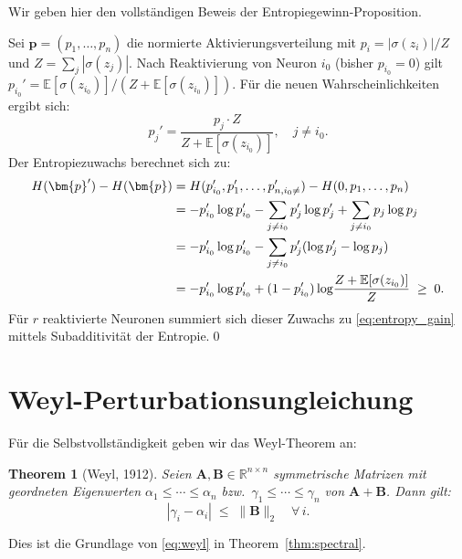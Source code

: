 \documentclass[12pt, a4paper, openany]{report}
\newtheorem{theorem}{Theorem}[chapter]
\newcommand{\R}{\mathbb{R}}
\newcommand{\E}{\mathbb{E}}
\newcommand{\abs}[1]{\left|#1\right|}
\begin{document}
Wir geben hier den vollständigen Beweis der Entropiegewinn-Proposition.

Sei $\bm{p} = (p_1, \ldots, p_n)$ die normierte Aktivierungsverteilung
mit $p_i = |\sigma(z_i)| / Z$ und $Z = \sum_j |\sigma(z_j)|$.
Nach Reaktivierung von Neuron $i_0$ (bisher $p_{i_0} = 0$) gilt
$p_{i_0}' = \E[\sigma(z_{i_0})] / (Z + \E[\sigma(z_{i_0})])$.
Für die neuen Wahrscheinlichkeiten ergibt sich:
\[
  p_j' = \frac{p_j \cdot Z}{Z + \E[\sigma(z_{i_0})]}, \quad j \neq i_0.
\]
Der Entropiezuwachs berechnet sich zu:
\begin{align}
  H(\bm{p}') - H(\bm{p})
  &= H(p_{i_0}', p_1', \ldots, p_{n, i_0\neq}') - H(0, p_1, \ldots, p_n) \notag \\
  &= -p_{i_0}'\log p_{i_0}'
     - \sum_{j \neq i_0} p_j' \log p_j'
     + \sum_{j \neq i_0} p_j \log p_j \notag \\
  &= -p_{i_0}'\log p_{i_0}'
     - \sum_{j \neq i_0} p_j' (\log p_j' - \log p_j) \notag \\
  &= -p_{i_0}'\log p_{i_0}'
     + (1 - p_{i_0}') \log\!\frac{Z + \E[\sigma(z_{i_0})]}{Z}
     \;\geq\; 0.
\end{align}
Für $r$ reaktivierte Neuronen summiert sich dieser Zuwachs zu
\eqref{eq:entropy_gain} mittels Subadditivität der Entropie.\qed

\section{Weyl-Perturbationsungleichung}

Für die Selbstvollständigkeit geben wir das Weyl-Theorem an:

\begin{theorem}[Weyl, 1912]
Seien $\bm{A}, \bm{B} \in \R^{n\times n}$ symmetrische Matrizen mit
geordneten Eigenwerten $\alpha_1 \leq \cdots \leq \alpha_n$ bzw.\
$\gamma_1 \leq \cdots \leq \gamma_n$ von $\bm{A}+\bm{B}$.  Dann gilt:
\[
  \abs{\gamma_i - \alpha_i} \;\leq\; \|\bm{B}\|_2 \quad \forall\, i.
\]
\end{theorem}

Dies ist die Grundlage von \eqref{eq:weyl} in Theorem~\ref{thm:spectral}.
\end{document}
